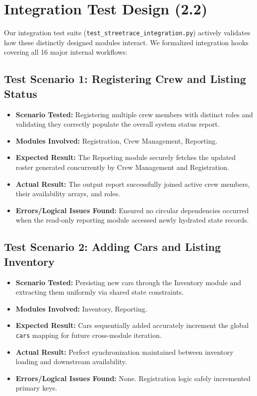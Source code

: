 \documentclass[12pt,a4paper]{article}
\begin{document}
\section{Integration Test Design (2.2)}
Our integration test suite (\texttt{test\_streetrace\_integration.py}) actively validates how these distinctly designed modules interact. We formalized integration hooks covering all 16 major internal workflows:

\subsection{Test Scenario 1: Registering Crew and Listing Status}
\begin{itemize}
    \item \textbf{Scenario Tested:} Registering multiple crew members with distinct roles and validating they correctly populate the overall system status report.
    \item \textbf{Modules Involved:} Registration, Crew Management, Reporting.
    \item \textbf{Expected Result:} The Reporting module securely fetches the updated roster generated concurrently by Crew Management and Registration.
    \item \textbf{Actual Result:} The output report successfully joined active crew members, their availability arrays, and roles.
    \item \textbf{Errors/Logical Issues Found:} Ensured no circular dependencies occurred when the read-only reporting module accessed newly hydrated state records.
\end{itemize}

\subsection{Test Scenario 2: Adding Cars and Listing Inventory}
\begin{itemize}
    \item \textbf{Scenario Tested:} Persisting new cars through the Inventory module and extracting them uniformly via shared state constraints.
    \item \textbf{Modules Involved:} Inventory, Reporting.
    \item \textbf{Expected Result:} Cars sequentially added accurately increment the global \texttt{cars} mapping for future cross-module iteration.
    \item \textbf{Actual Result:} Perfect synchronization maintained between inventory loading and downstream availability.
    \item \textbf{Errors/Logical Issues Found:} None. Registration logic safely incremented primary keys.
\end{itemize}
\end{document}
